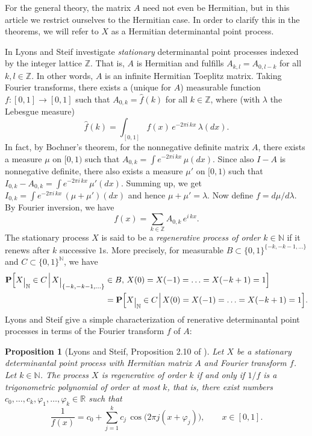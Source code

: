 \documentclass[11pt]{article}
\providecommand{\1}{\mathBB{1}}
\renewcommand{\P}{\mathbf{P}}
\def\ggiven{\hspace{1.2pt}\Big|\hspace{1.2pt}}
\newcommand{\R}{{\mathbb{R}}}
\newcommand{\N}{{\mathbb{N}}}
\newcommand{\Z}{{\mathbb{Z}}}
\def\hatf{\widehat f}
\newtheorem{proposition}{Proposition}[section]
\newcommand{\rest}[1]{\raisebox{-0.3em}{$\big|_{\scriptstyle
#1}$}}
\begin{document}
For the general theory, the matrix $A$ need not even be Hermitian, but in this article we restrict ourselves to the Hermitian case. In order to clarify this in the theorems, we will refer to $X$ as a Hermitian determinantal point process.

In \cite{LyonsSteif2003} Lyons and Steif investigate \emph{stationary} determinantal point processes indexed by the integer lattice $\Z$. That is, $A$ is Hermitian and fulfills $A_{k,l}=A_{0,l-k}$ for all $k,l\in\Z$. In other words, $A$ is an infinite Hermitian Toeplitz matrix. Taking Fourier transforms, there exists a (unique for $A$) measurable function $f:[0,1]\to[0,1]$ such that $A_{0,k}=\hatf(k)$ for all $k\in\Z$, where (with $\lambda$ the Lebesgue measure)
\begin{equation}
\label{E1.04}
\hatf(k)=\int_{[0,1]}f(x)\,e^{-2\pi i\,kx}\,\lambda(dx).
\end{equation}
In fact, by Bochner's theorem, for the nonnegative definite matrix $A$, there exists a measure $\mu$ on $[0,1)$ such that $A_{0,k}=\int e^{-2\pi i\,kx}\,\mu(dx)$. Since also $I-A$ is nonnegative definite, there also exists a measure $\mu'$ on $[0,1)$ such that $I_{0,k}-A_{0,k}=\int e^{-2\pi i\,kx}\,\mu'(dx).$
Summing up, we get
$I_{0,k}=\int e^{-2\pi i\,kx}\,(\mu+\mu')(dx)$
and hence $\mu+\mu'=\lambda$. Now define $f=d\mu/d\lambda$.
By Fourier inversion, we have
\begin{equation}
\label{E1.05}
f(x)=\sum_{k\in\Z}A_{0,k}\,e^{i\,kx}.
\end{equation}
The stationary process $X$ is said to be a \emph{regenerative process of order $k\in\N$} if it renews after $k$ successive $1$s. More precisely, for measurable $B\subset\{0,1\}^{\{-k,-k-1,\ldots\}}$ and $C\subset\{0,1\}^\N$, we have
$$\begin{aligned}
\P\Big[X\rest{\N}\in C\ggiven X\rest{\{-k,-k-1,\ldots\}}&\in B,\,X(0)=X(-1)=\ldots=X(-k+1)=1\Big]\\
&=\P\Big[X\rest\N\in C\ggiven X(0)=X(-1)=\ldots=X(-k+1)=1\Big].\end{aligned}
$$
Lyons and Steif \cite[Proposition 2.10]{LyonsSteif2003} give a simple characterization of renerative determinantal point processes in terms of the Fourier transform $f$ of $A$:
\begin{proposition}[Lyons and Steif, Proposition 2.10 of \cite{LyonsSteif2003}]
\label{P1.1}
Let $X$ be a stationary determinantal point process with Hermitian matrix $A$ and Fourier transform $f$. Let $k\in\N$. The process $X$ is regenerative of order $k$ if and only if
$1/f$ is a trigonometric polynomial of order at most $k$, that is, there exist numbers $c_0,\ldots,c_k,\varphi_1,\ldots,\varphi_k\in\R$ such that
\begin{equation}
\label{E1.06}
\frac{1}{f(x)}=c_0+\sum_{j=1}^kc_j\,\cos\big(2\pi j(x+\varphi_j)\big),\qquad x\in[0,1].
\end{equation}
\end{proposition}
\end{document}
